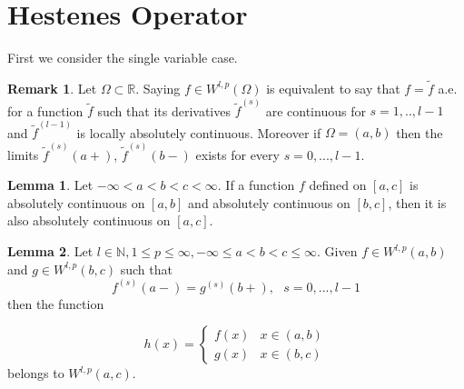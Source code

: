 \documentclass[12pt]{article}
\theoremstyle{definition}
\newtheorem{remark}{Remark}
\newtheorem{lemma}{Lemma}
\begin{document}
\section{Hestenes Operator}

\iffalse
First we consider the single variable case.

\begin{remark}
Let $\Omega \subset \mathbb{R}$. Saying $f\in W^{l,p}(\Omega)$ is equivalent to say that $f=\widetilde{f}$ a.e. for a function $\widetilde{f}$ such that its derivatives $\widetilde{f}^{(s)}$ are continuous for $s=1,..,l-1$ and $\widetilde{f}^{(l-1)}$ is locally absolutely continuous. Moreover if $\Omega=(a,b)$ then the limits $\widetilde{f}^{(s)}(a+)$, $\widetilde{f}^{(s)}(b-)$ exists for every $s=0,...,l-1$.
\end{remark}

\begin{lemma}
Let $-\infty<a<b<c<\infty$. If a function $f$ defined on $[a,c]$  is absolutely continuous on $[a,b]$ and absolutely continuous on $[b,c]$, then it is also absolutely continuous on $[a,c]$.
\end{lemma}

\begin{lemma}
Let $l\in  \mathbb{N}, 1\le p \le \infty, -\infty\le a <b <c \le \infty$. Given $f \in W^{l,p}(a,b)$ and $g \in W^{l,p}(b,c)$ such that
\[ f^{(s)}(a-)=g^{(s)}(b+),  \ \ \  s=0,...,l-1 \]
then the function

\[   h(x)=\begin{cases}
		f(x) & x\in(a,b) \\
		g(x) & x \in (b,c) 
	    \end{cases}
\]
belongs to $W^{l,p}(a,c)$.
\end{lemma}
\end{document}
